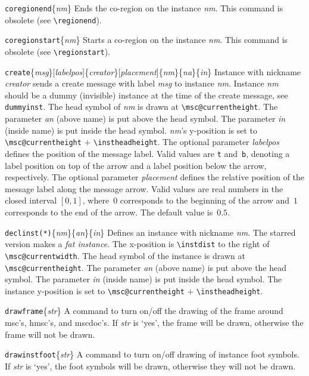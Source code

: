 \documentclass[a4paper]{article}
\newcommand{\cmd}[1]{\texttt{\bslash #1}}
\newcommand{\opt}[1]{[#1]}
\newenvironment{defs}{%
  \begin{list}{}%
              {\setlength{\labelwidth}{0pt}%
               \setlength{\labelsep}{1em}%
               \setlength{\leftmargin}{1em}%
               \setlength{\parsep}{1ex}%
               \setlength{\listparindent}{0pt}%
               \setlength{\rightmargin}{0pt}%
               \renewcommand{\makelabel}[1]{##1}%
               \raggedright%
              }%
  }{%
  \end{list}}
\begin{document}
\begin{defs}
\item[\cmd{coregionend}\{\emph{nm}\}] Ends the co-region on the instance
\emph{nm}. This command is obsolete (see \verb|\regionend|).

\item[\cmd{coregionstart}\{\emph{nm}\}] Starts a co-region on the instance
\emph{nm}. This command is obsolete (see \verb|\regionstart|).

\item[\cmd{create}\{\emph{msg}\}\opt{\emph{labelpos}}\{\emph{creator}\}\opt{\emph{placement}}\{\emph{nm}\}\{\emph{na}\}\{\emph{in}\}]
Instance with nickname \emph{creator} sends a create message with
label \emph{msg} to instance \emph{nm}. Instance \emph{nm} should be a
dummy (invisible) instance at the time of the create message, see
\cmd{dummyinst}. The head symbol of \emph{nm} is drawn at
\verb|\msc@currentheight|. The parameter \emph{an} (above name) is put
above the head symbol. The parameter \emph{in} (inside name) is put
inside the head symbol. \emph{nm}'s y-position is set to
\verb|\msc@currentheight| $+$ \verb|\instheadheight|.  The optional
parameter \emph{labelpos} defines the position of the message label. Valid
values are \verb|t| and~\verb|b|, denoting a label position on top of
the arrow and a label position below the arrow, respectively.  The
optional parameter \emph{placement} defines the relative position of
the message label along the message arrow. Valid values are real
numbers in the closed interval $[0,1]$, where~$0$ corresponds to the
beginning of the arrow and~$1$ corresponds to the end of the
arrow. The default value is~$0.5$.

\item[\cmd{declinst(*)}\{\emph{nm}\}\{\emph{an}\}\{\emph{in}\}]
Defines an instance with nickname \emph{nm}.  The starred version
makes a \emph{fat instance}. The x-position is \verb|\instdist| to the
right of \verb|\msc@currentwidth|. The head symbol of the instance is
drawn at \verb|\msc@currentheight|. The parameter \emph{an} (above
name) is put above the head symbol. The parameter \emph{in} (inside
name) is put inside the head symbol. The
instance y-position is set to \verb|\msc@currentheight| $+$ \verb|\instheadheight|.


\item[\cmd{drawframe}\{\emph{str}\}] A command to turn on/off the
drawing of the frame around msc's, hmsc's, and mscdoc's. If \emph{str}
is `yes', the frame will be drawn, otherwise the frame will not be
drawn.

\item[\cmd{drawinstfoot}\{\emph{str}\}] A command to turn on/off
drawing of instance foot symbols. If \emph{str} is `yes', the foot
symbols will be drawn, otherwise they will not be drawn.


\end{defs}
\end{document}
